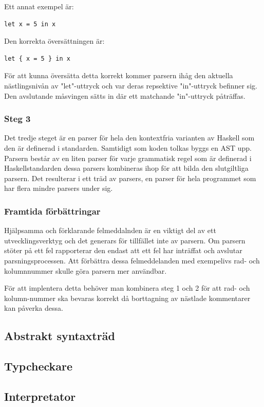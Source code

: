 Ett annat exempel är:
\begin{lstlisting}
let x = 5 in x
\end{lstlisting}
Den korrekta översättningen är:
\begin{lstlisting}
let { x = 5 } in x
\end{lstlisting}
För att kunna översätta detta korrekt kommer parsern ihåg den aktuella nästlingsnivån av "let"-uttryck och var deras repsektive "in"-uttryck befinner sig. 
Den avslutande måsvingen sätts in där ett matchande "in"-uttryck påträffas.

\subsubsection{Steg 3}
Det tredje steget är en parser för hela den kontextfria varianten av Haskell som den är definerad i standarden. 
Samtidigt som koden tolkas byggs en AST upp. Parsern består av en liten parser för varje grammatisk regel som är definerad i Haskellstandarden 
dessa parsers kombineras ihop för att bilda den slutgiltliga parsern. Det resulterar i ett träd av parsers, en parser för hela programmet som har flera mindre parsers under sig.

\subsubsection{Framtida förbättringar}
Hjälpsamma och förklarande felmeddalnden är en viktigt del av ett utvecklingsverktyg och det generars för tillfället inte av parsern. 
Om parsern stöter på ett fel rapporterar den endast att ett fel har inträffat och avslutar parsningsprocessen. 
Att förbättra dessa felmeddelanden med exempelivs rad- och kolumnnummer skulle göra parsern mer användbar.

För att implentera detta behöver man kombinera steg 1 och 2 för att rad- och kolumn-nummer ska bevaras korrekt då borttagning av nästlade kommentarer kan påverka dessa.

\subsection{Abstrakt syntaxträd} 

\subsection{Typcheckare} 

\subsection{Interpretator}


